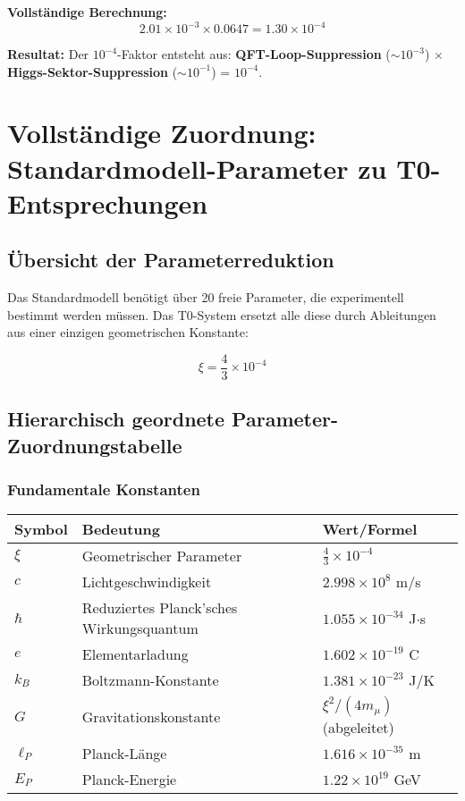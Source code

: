 \documentclass[12pt,a4paper]{article}
\begin{document}
	\textbf{Vollständige Berechnung:}
	\begin{equation}
		2.01 \times 10^{-3} \times 0.0647 = 1.30 \times 10^{-4}
	\end{equation}
	
	\textbf{Resultat:}
	Der $10^{-4}$-Faktor entsteht aus: \textbf{QFT-Loop-Suppression} ($\sim 10^{-3}$) $\times$ \textbf{Higgs-Sektor-Suppression} ($\sim 10^{-1}$) = $10^{-4}$.
	
	\section{Vollständige Zuordnung: Standardmodell-Parameter zu T0-Entsprechungen}
	
	\subsection{Übersicht der Parameterreduktion}
	
	Das Standardmodell benötigt über 20 freie Parameter, die experimentell bestimmt werden müssen. Das T0-System ersetzt alle diese durch Ableitungen aus einer einzigen geometrischen Konstante:
	
	\begin{equation}
		\boxed{\xi = \frac{4}{3} \times 10^{-4}}
	\end{equation}
	
	\subsection{Hierarchisch geordnete Parameter-Zuordnungstabelle}
	
	\subsubsection{Fundamentale Konstanten}
	\begin{longtable}{lll}
		\toprule
		\textbf{Symbol} & \textbf{Bedeutung} & \textbf{Wert/Formel} \\
		\midrule
		$\xi$ & Geometrischer Parameter & $\frac{4}{3} \times 10^{-4}$ \\
		$c$ & Lichtgeschwindigkeit & $2.998 \times 10^{8}$ m/s \\
		$\hbar$ & Reduziertes Planck'sches Wirkungsquantum & $1.055 \times 10^{-34}$ J$\cdot$s \\
		$e$ & Elementarladung & $1.602 \times 10^{-19}$ C \\
		$k_B$ & Boltzmann-Konstante & $1.381 \times 10^{-23}$ J/K \\
		$G$ & Gravitationskonstante & $\xi^2/(4m_\mu)$ (abgeleitet) \\
		$\ell_P$ & Planck-Länge & $1.616 \times 10^{-35}$ m \\
		$E_P$ & Planck-Energie & $1.22 \times 10^{19}$ GeV \\
		\bottomrule
	\end{longtable}
	
\end{document}
